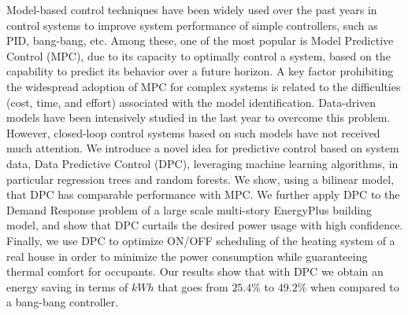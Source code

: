 Model-based control techniques have been widely used over the past years in control systems to improve system performance of simple controllers, such as PID, bang-bang, etc. Among these, one of the most popular is Model Predictive Control (MPC), due to its capacity to optimally control a system, based on the capability to predict its behavior over a future horizon. A key factor prohibiting the widespread adoption of MPC for complex systems is related to the difficulties (cost, time, and effort) associated with the model identification. Data-driven models have been intensively studied in the last year to overcome this problem. However, closed-loop control systems based on such models have not received much attention. We introduce a novel idea for predictive control based on system data, Data Predictive Control (DPC), leveraging machine learning algorithms, in particular regression trees and random forests. We show, using a bilinear model, that DPC has comparable performance with MPC. We further apply DPC to the Demand Response problem of a large scale multi-story EnergyPlus building model, and show that DPC curtails the desired power usage with high confidence. Finally, we use DPC to optimize ON/OFF scheduling of the heating system of a real house in order to minimize the power consumption while guaranteeing thermal comfort for occupants. Our results show that with DPC we obtain an energy saving in terms of $kWh$ that goes from $25.4\%$ to $49.2\%$ when compared to a bang-bang controller.